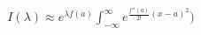 \documentclass[preview]{standalone}
\begin{document}
\begin{align*}
I(\lambda) \approx \displaystyle e^{\lambda f(a)} \int_{-\infty}^{\infty} e^{\frac{f''(a)}{2!}(x - a)^2})
\end{align*}
\end{document}
